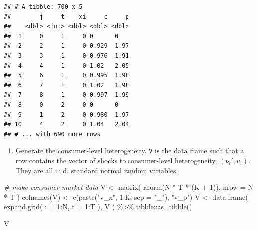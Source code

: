\documentclass[
]{book}
\newenvironment{Shaded}{\begin{snugshade}}{\end{snugshade}}
\newcommand{\AttributeTok}[1]{\textcolor[rgb]{0.77,0.63,0.00}{#1}}
\newcommand{\CommentTok}[1]{\textcolor[rgb]{0.56,0.35,0.01}{\textit{#1}}}
\newcommand{\DecValTok}[1]{\textcolor[rgb]{0.00,0.00,0.81}{#1}}
\newcommand{\FunctionTok}[1]{\textcolor[rgb]{0.00,0.00,0.00}{#1}}
\newcommand{\NormalTok}[1]{#1}
\newcommand{\OtherTok}[1]{\textcolor[rgb]{0.56,0.35,0.01}{#1}}
\newcommand{\SpecialCharTok}[1]{\textcolor[rgb]{0.00,0.00,0.00}{#1}}
\newcommand{\StringTok}[1]{\textcolor[rgb]{0.31,0.60,0.02}{#1}}
\providecommand{\tightlist}{%
  \setlength{\itemsep}{0pt}\setlength{\parskip}{0pt}}
\begin{document}
\begin{verbatim}
## # A tibble: 700 x 5
##        j     t    xi     c     p
##    <dbl> <int> <dbl> <dbl> <dbl>
##  1     0     1     0 0      0   
##  2     2     1     0 0.929  1.97
##  3     3     1     0 0.976  1.91
##  4     4     1     0 1.02   2.05
##  5     6     1     0 0.995  1.98
##  6     7     1     0 1.02   1.98
##  7     8     1     0 0.997  1.99
##  8     0     2     0 0      0   
##  9     1     2     0 0.980  1.97
## 10     4     2     0 1.04   2.04
## # ... with 690 more rows
\end{verbatim}

\begin{enumerate}
\def\labelenumi{\arabic{enumi}.}
\setcounter{enumi}{3}
\tightlist
\item
  Generate the consumer-level heterogeneity. \texttt{V} is the data frame such that a row contains the vector of shocks to consumer-level heterogeneity, \((\nu_{i}', \upsilon_i)\). They are all i.i.d. standard normal random variables.
\end{enumerate}

\begin{Shaded}
\begin{Highlighting}[]
\CommentTok{\# make consumer{-}market data}
\NormalTok{V }\OtherTok{\textless{}{-}} 
  \FunctionTok{matrix}\NormalTok{(}
    \FunctionTok{rnorm}\NormalTok{(N }\SpecialCharTok{*}\NormalTok{ T }\SpecialCharTok{*}\NormalTok{ (K }\SpecialCharTok{+} \DecValTok{1}\NormalTok{)), }
    \AttributeTok{nrow =}\NormalTok{ N }\SpecialCharTok{*}\NormalTok{ T}
\NormalTok{    ) }
\FunctionTok{colnames}\NormalTok{(V) }\OtherTok{\textless{}{-}} \FunctionTok{c}\NormalTok{(}\FunctionTok{paste}\NormalTok{(}\StringTok{"v\_x"}\NormalTok{, }\DecValTok{1}\SpecialCharTok{:}\NormalTok{K, }\AttributeTok{sep =} \StringTok{"\_"}\NormalTok{), }\StringTok{"v\_p"}\NormalTok{)}
\NormalTok{V }\OtherTok{\textless{}{-}} 
  \FunctionTok{data.frame}\NormalTok{(}
    \FunctionTok{expand.grid}\NormalTok{(}
      \AttributeTok{i =} \DecValTok{1}\SpecialCharTok{:}\NormalTok{N, }
      \AttributeTok{t =} \DecValTok{1}\SpecialCharTok{:}\NormalTok{T}
\NormalTok{      ),}
\NormalTok{    V}
\NormalTok{    ) }\SpecialCharTok{\%\textgreater{}\%}
\NormalTok{  tibble}\SpecialCharTok{::}\FunctionTok{as\_tibble}\NormalTok{()}
\end{Highlighting}
\end{Shaded}

\begin{Shaded}
\begin{Highlighting}[]
\NormalTok{V}
\end{Highlighting}
\end{Shaded}
\end{document}
